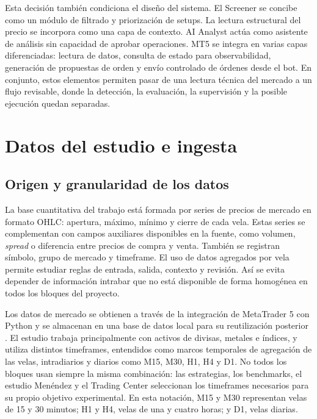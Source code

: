 Esta decisi\'on tambi\'en condiciona el dise\~no del sistema. El Screener se
concibe como un m\'odulo de filtrado y priorizaci\'on de setups. La lectura
estructural del precio se incorpora como una capa de contexto. AI Analyst act\'ua
como asistente de an\'alisis sin capacidad de aprobar operaciones.
MT5 se integra en varias capas diferenciadas: lectura de datos, consulta de
estado para observabilidad, generaci\'on de propuestas de orden y env\'io
controlado de \'ordenes desde el bot. En conjunto, estos elementos permiten
pasar de una lectura t\'ecnica del mercado a un flujo revisable, donde la
detecci\'on, la evaluaci\'on, la supervisi\'on y la posible ejecuci\'on quedan
separadas.

\section{Datos del estudio e ingesta}
\label{sec:datos-ingesta}

\subsection{Origen y granularidad de los datos}
\label{subsec:origen-granularidad-datos}

La base cuantitativa del trabajo est\'a formada por series de precios de
mercado en formato OHLC: apertura, m\'aximo, m\'inimo y cierre de cada vela.
Estas series se complementan con campos auxiliares disponibles en la fuente,
como volumen, \textit{spread} o diferencia entre precios de compra y venta.
Tambi\'en se registran s\'imbolo, grupo de mercado y timeframe. El uso de
datos agregados por vela permite estudiar reglas de entrada, salida, contexto
y revisi\'on. As\'i se evita depender de informaci\'on intrabar que no est\'a
disponible de forma homog\'enea en todos los bloques del proyecto.

Los datos de mercado se obtienen a trav\'es de la integraci\'on de MetaTrader 5
con Python y se almacenan en una base de datos local para su reutilizaci\'on
posterior \cite{metatrader5_python_docs}. El estudio trabaja principalmente con
activos de divisas, metales e \'indices, y utiliza distintos timeframes,
entendidos como marcos temporales de agregaci\'on de las velas, intradiarios y
diarios como M15, M30, H1, H4 y D1.
No todos los bloques usan siempre la misma
combinaci\'on: las estrategias, los benchmarks, el estudio Men\'endez y el
Trading Center seleccionan los timeframes necesarios para su propio objetivo
experimental.
En esta notaci\'on, M15 y M30 representan velas de 15 y 30 minutos; H1 y H4,
velas de una y cuatro horas; y D1, velas diarias.

